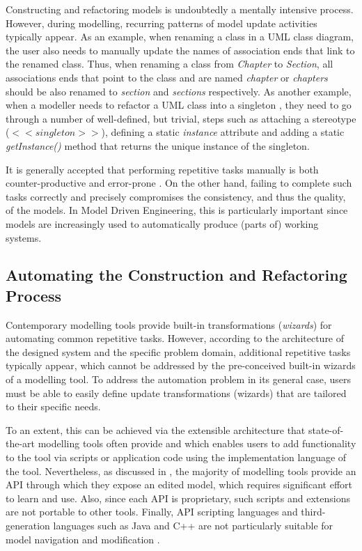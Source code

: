 Constructing and refactoring models is undoubtedly a mentally intensive process. However, during modelling, recurring patterns of model update activities typically appear. As an example, when renaming a class in a UML class diagram, the user also needs to manually update the names of association ends that link to the renamed class. Thus, when renaming a class from \emph{Chapter} to \emph{Section}, all associations ends that point to the class and are named \emph{chapter} or \emph{chapters} should be also renamed to \emph{section} and \emph{sections} respectively. As another example, when a modeller needs to refactor a UML class into a singleton \cite{Larman}, they need to go through a number of well-defined, but trivial, steps such as attaching a stereotype ($<<singleton>>$), defining a static \emph{instance} attribute and adding a static \emph{getInstance()} method that returns the unique instance of the singleton.

It is generally accepted that performing repetitive tasks manually is both counter-productive and error-prone \cite{CG.InAction}. On the other hand, failing to complete such tasks correctly and precisely compromises the consistency, and thus the quality, of the models. In Model Driven Engineering, this is particularly important since models are increasingly used to automatically produce (parts of) working systems. 

\subsection{Automating the Construction and Refactoring Process}

Contemporary modelling tools provide built-in transformations (\textit{wizards}) for automating common repetitive tasks. However, according to the architecture of the designed system and the specific problem domain, additional repetitive tasks typically appear, which cannot be addressed by the pre-conceived built-in wizards of a modelling tool. To address the automation problem in its general case, users must be able to easily define update transformations (wizards) that are tailored to their specific needs.

To an extent, this can be achieved via the extensible architecture that state-of-the-art modelling tools often provide and which enables users to add functionality to the tool via scripts or application code using the implementation language of the tool. Nevertheless, as discussed in \cite{EOL}, the majority of modelling tools provide an API through which they expose an edited model, which requires significant effort to learn and use. Also, since each API is proprietary, such scripts and extensions are not portable to other tools. Finally, API scripting languages and third-generation languages such as Java and C++ are not particularly suitable for model navigation and modification \cite{EOL}.

